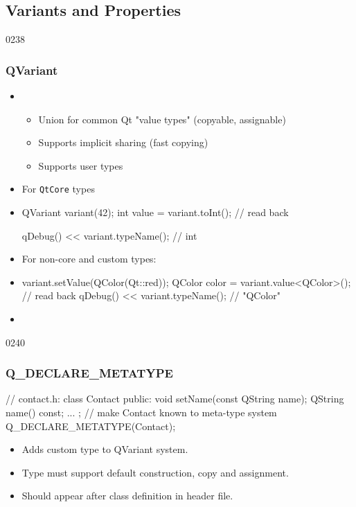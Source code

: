 %
%
%
%

\subsection{Variants and Properties}

\begin{slide}[fragile]{0238}\frametitle{QVariant}
\begin{itemize}
  \item {} 
  \begin{itemize}
    \item Union for common Qt "value types" (copyable, assignable)
    \item Supports implicit sharing (fast copying)
    \item Supports user types
  \end{itemize}
  \item For \texttt{QtCore} types  
  \item[] \begin{cpp}
QVariant variant(42);
int value = variant.toInt(); // read back

qDebug() << variant.typeName(); // int
\end{cpp}
\item For non-core and custom types:
  \item[] \begin{cpp}
variant.setValue(QColor(Qt::red));
QColor color = variant.value<QColor>(); // read back
qDebug() << variant.typeName(); // "QColor"
\end{cpp}
\item {}
\end{itemize}
\end{slide}

\begin{slide}[fragile]{0240}
\frametitle{Q\_DECLARE\_METATYPE}
\begin{cpp}
// contact.h:
class Contact {
public:
  void setName(const QString name);
  QString name() const;
  ...
};
// make Contact known to meta-type system
Q_DECLARE_METATYPE(Contact);
\end{cpp} 
\begin{itemize}
\item Adds custom type to QVariant system.
\item Type must support default construction, copy and assignment.
\item Should appear after class definition in header file.
\end{itemize}
\end{slide}

